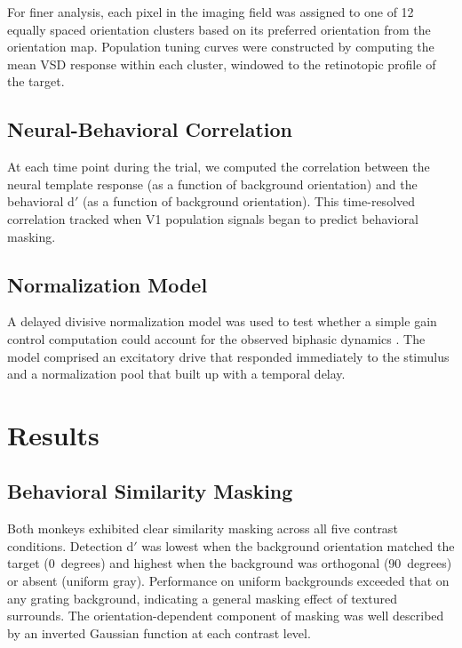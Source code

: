 \documentclass[11pt]{article}
\begin{document}
For finer analysis, each pixel in the imaging field was assigned to one of 12 equally spaced orientation clusters based on its preferred orientation from the orientation map. Population tuning curves were constructed by computing the mean VSD response within each cluster, windowed to the retinotopic profile of the target.

\subsection{Neural-Behavioral Correlation}

At each time point during the trial, we computed the correlation between the neural template response (as a function of background orientation) and the behavioral d$'$ (as a function of background orientation). This time-resolved correlation tracked when V1 population signals began to predict behavioral masking.

\subsection{Normalization Model}

A delayed divisive normalization model was used to test whether a simple gain control computation could account for the observed biphasic dynamics \citep{carandini2012,reynoldsheeger2009}. The model comprised an excitatory drive that responded immediately to the stimulus and a normalization pool that built up with a temporal delay.

\section{Results}

\subsection{Behavioral Similarity Masking}

Both monkeys exhibited clear similarity masking across all five contrast conditions. Detection d$'$ was lowest when the background orientation matched the target (0~degrees) and highest when the background was orthogonal (90~degrees) or absent (uniform gray). Performance on uniform backgrounds exceeded that on any grating background, indicating a general masking effect of textured surrounds. The orientation-dependent component of masking was well described by an inverted Gaussian function at each contrast level.
\end{document}
